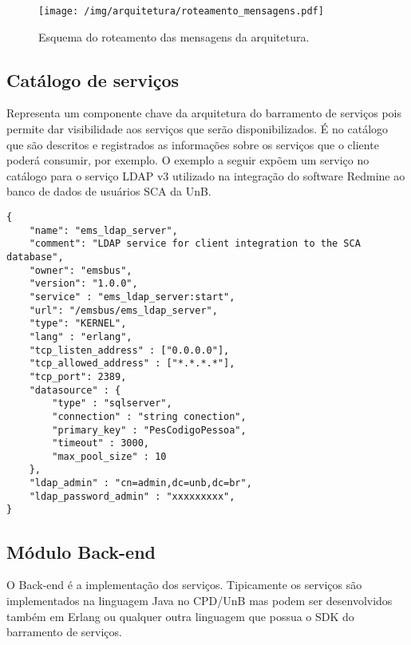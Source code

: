 \begin{figure}[htb]
\centering
\texttt{[image: /img/arquitetura/roteamento\_mensagens.pdf]}
\caption{Esquema do roteamento das mensagens da arquitetura.}
\label{fig:roteamento_mensagens}
\end{figure}
\FloatBarrier


\subsection{Catálogo de serviços}

Representa um componente chave da arquitetura do barramento de serviços pois permite
dar visibilidade aos serviços que serão disponibilizados. É no catálogo
que são descritos e registrados as informações sobre os serviços
que o cliente poderá consumir, por exemplo. O exemplo a seguir expõem um serviço no catálogo 
para o serviço LDAP v3 utilizado na integração do software Redmine 
ao banco de dados de usuários SCA da UnB.


\renewcommand{\lstlistingname}{Código}             
\begin{lstlisting}[caption=Exemplo de um serviço no catálogo de serviços., label=fig:catalogo_processo] 
{
	"name": "ems_ldap_server",
	"comment": "LDAP service for client integration to the SCA database",
	"owner": "emsbus",
	"version": "1.0.0",
	"service" : "ems_ldap_server:start",
	"url": "/emsbus/ems_ldap_server",
	"type": "KERNEL",
	"lang" : "erlang",
	"tcp_listen_address" : ["0.0.0.0"],
	"tcp_allowed_address" : ["*.*.*.*"],
	"tcp_port": 2389,
	"datasource" : {
		"type" : "sqlserver",
		"connection" : "string conection",
		"primary_key" : "PesCodigoPessoa",
		"timeout" : 3000,
		"max_pool_size" : 10
	},	
	"ldap_admin" : "cn=admin,dc=unb,dc=br",
	"ldap_password_admin" : "xxxxxxxxx",
}
\end{lstlisting}


\subsection{Módulo Back-end}

O Back-end é a implementação dos serviços. Tipicamente
os serviços são implementados na linguagem Java no CPD/UnB
mas podem ser desenvolvidos também em Erlang ou qualquer outra linguagem que possua 
o SDK do barramento de serviços. 


